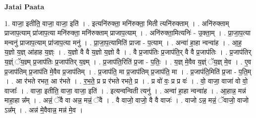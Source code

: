 \documentclass[17pt]{extarticle}
\begin{document}
\textbf{Jatai Paata} \newline

1. वाजा॒ इतीति॒ वाजा॒ वाजा॒ इति॑ । . इत्यनि॑रुक्ता॒ मनि॑रुक्ता॒ मिती त्यनि॑रुक्ताम् । . अनि॑रुक्ताम् प्राजाप॒त्याम् प्रा॑जाप॒त्या मनि॑रुक्ता॒ मनि॑रुक्ताम् प्राजाप॒त्याम् । . अनि॑रुक्ता॒मित्यनिः॑ - उ॒क्ता॒म् । . प्रा॒जा॒प॒त्या मन्वनु॑ प्राजाप॒त्याम् प्रा॑जाप॒त्या मनु॑ । . प्रा॒जा॒प॒त्यामिति॑ प्राजा - प॒त्याम् । . अन्वा॑ हा॒हा न्वन्वा॑ह । . आ॒ह॒ य॒ज्ञो य॒ज्ञ् आ॑हाह य॒ज्ञ्ः । . य॒ज्ञो वै वै य॒ज्ञो य॒ज्ञो वै । . वै प्र॒जाप॑तिः प्र॒जाप॑ति॒र् वै वै प्र॒जाप॑तिः । . प्र॒जाप॑तिर् य॒ज्ञ्ं ॅय॒ज्ञ्म् प्र॒जाप॑तिः प्र॒जाप॑तिर् य॒ज्ञ्म् । . प्र॒जाप॑ति॒रिति॑ प्र॒जा - प॒तिः॒ । . य॒ज्ञ् मे॒वैव य॒ज्ञ्ं ॅय॒ज्ञ् मे॒व । . ए॒व प्र॒जाप॑तिम् प्र॒जाप॑ति मे॒वैव प्र॒जाप॑तिम् । . प्र॒जाप॑ति॒ मा प्र॒जाप॑तिम् प्र॒जाप॑ति॒ मा । . प्र॒जाप॑ति॒मिति॑ प्र॒जा - प॒ति॒म् । . आ र॑भते रभत॒ आ र॑भते । . र॒भ॒ते॒ प्र प्र र॑भते रभते॒ प्र । . प्र वो॑ वः॒ प्र प्र वः॑ । . वो॒ वाजा॒ वाजा॑ वो वो॒ वाजाः᳚ । . वाजा॒ इतीति॒ वाजा॒ वाजा॒ इति॑ । . इत्यन्वन्विती त्यनु॑ । . अन्वा॑ हा॒हा न्वन्वा॑ह । . आ॒हान्न॒ मन्न॑ माहा॒हा न्न᳚म् । . अन्नं॒ ॅवै वा अन्न॒ मन्नं॒ ॅवै । . वै वाजो॒ वाजो॒ वै वै वाजः॑ । . वाजो ऽन्न॒ मन्नं॒ ॅवाजो॒ वाजो ऽन्न᳚म् । . अन्न॑ मे॒वैवान्न॒ मन्न॑ मे॒व । \newline
\end{document}
